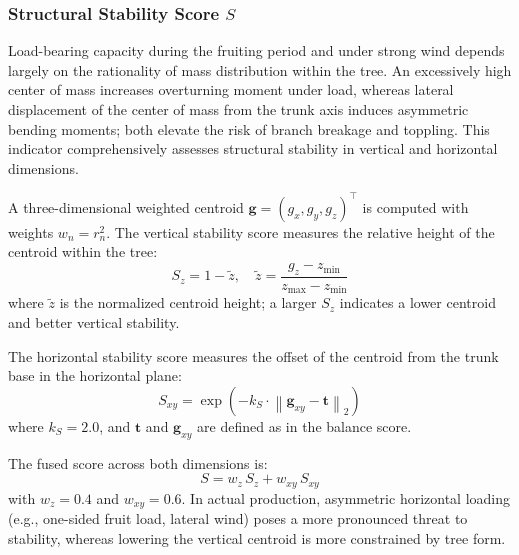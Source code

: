 \documentclass[12pt,a4paper,fontset=fandol]{ctexart}
\begin{document}
\subsubsection{Structural Stability Score $S$}

Load-bearing capacity during the fruiting period and under strong wind
depends largely on the rationality of mass distribution within the tree.
An excessively high center of mass increases overturning moment under load,
whereas lateral displacement of the center of mass from the trunk axis induces asymmetric bending moments;
both elevate the risk of branch breakage and toppling.
This indicator comprehensively assesses structural stability in vertical and horizontal dimensions.

A three-dimensional weighted centroid $\mathbf{g} = (g_x, g_y, g_z)^{\!\top}$ is computed with weights $w_n = r_n^2$.
The vertical stability score measures the relative height of the centroid within the tree:
\begin{equation}\label{eq:stability_z}
  S_z = 1 - \tilde{z}, \quad
  \tilde{z} = \frac{g_z - z_{\min}}{z_{\max} - z_{\min}}
\end{equation}
where $\tilde{z}$ is the normalized centroid height; a larger $S_z$ indicates a lower centroid and better vertical stability.

The horizontal stability score measures the offset of the centroid from the trunk base in the horizontal plane:
\begin{equation}\label{eq:stability_xy}
  S_{xy} = \exp\!\left(-k_S \cdot \left\| \mathbf{g}_{xy} - \mathbf{t} \right\|_2 \right)
\end{equation}
where $k_S = 2.0$, and $\mathbf{t}$ and $\mathbf{g}_{xy}$ are defined as in the balance score.

The fused score across both dimensions is:
\begin{equation}\label{eq:stability}
  S = w_z \, S_z + w_{xy} \, S_{xy}
\end{equation}
with $w_z = 0.4$ and $w_{xy} = 0.6$.
In actual production, asymmetric horizontal loading
(e.g., one-sided fruit load, lateral wind) poses a more pronounced threat to stability,
whereas lowering the vertical centroid is more constrained by tree form.
\end{document}
